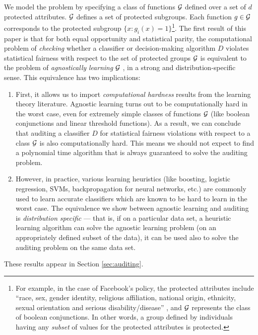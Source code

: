 We model the problem by specifying a class of functions $\mathcal{G}$ defined over a set of $d$ protected attributes. $\mathcal{G}$ defines a set of protected subgroups.
Each function $g \in \mathcal{G}$ corresponds to the protected
subgroup $\{x : g_i(x) = 1\}$\footnote{For example, in the case of Facebook's policy, the protected attributes include ``race, sex, gender identity, religious affiliation, national origin, ethnicity, sexual orientation and serious disability/disease'' \citep{propublicafacebook}, and $\mathcal{G}$ represents the class of boolean conjunctions. In other words, a group defined by individuals having any \emph{subset} of values for the protected attributes is protected.}. The first result of this paper is that for both equal opportunity and statistical parity, the computational problem of \emph{checking} whether a classifier or decision-making algorithm $D$ violates statistical fairness with respect to the set of protected groups $\mathcal{G}$ is equivalent to the problem of \emph{agnostically learning} $\mathcal{G}$ \citep{agnostic}, in a strong and
distribution-specific sense. This equivalence has two implications:
\begin{enumerate}
\item First, it allows us to import \emph{computational hardness} results from the learning theory literature. Agnostic learning turns out to be computationally hard in the worst case, even for extremely simple classes of functions $\mathcal{G}$ (like boolean conjunctions and linear threshold functions). As a result, we can conclude that auditing a classifier $D$ for statistical fairness violations with respect to a class $\mathcal{G}$ is also computationally hard. This means we should not expect to find a polynomial time algorithm that is always guaranteed to solve the auditing problem.

\item However, in practice, various learning heuristics (like boosting, logistic regression, SVMs, backpropagation for neural networks, etc.) are commonly used to learn accurate classifiers which are known to be hard to learn in the worst case. The equivalence we show between agnostic learning and auditing is \emph{distribution specific} --- that is, if on a particular data set, a heuristic learning algorithm can solve the agnostic learning problem (on an appropriately defined subset of the data), it can be used also to solve the auditing problem on the same data set. %
\end{enumerate}
These results appear in Section \ref{sec:auditing}.

